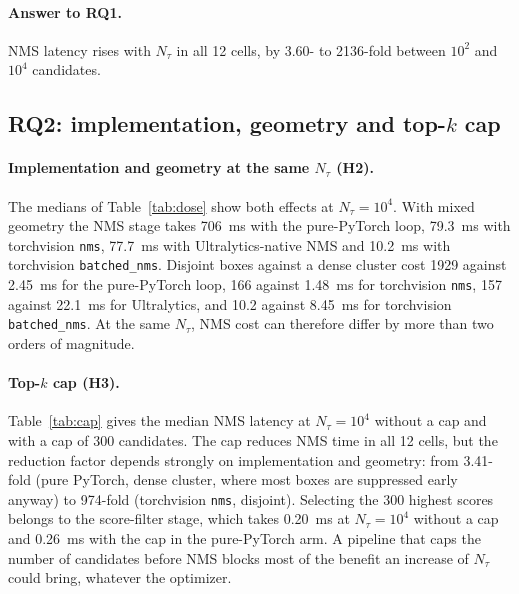 \documentclass[a4paper,fleqn]{cas-dc}
\newcommand{\Ntau}{N_{\tau}}
\begin{document}
\paragraph{Answer to RQ1.} NMS latency rises with $\Ntau$ in all 12 cells, by 3.60- to 2136-fold between $10^2$ and $10^4$ candidates.

\subsection{RQ2: implementation, geometry and top-$k$ cap}
\label{sec:q2}

\paragraph{Implementation and geometry at the same $\Ntau$ (H2).}
The medians of Table~\ref{tab:dose} show both effects at $\Ntau=10^4$. With mixed geometry the NMS stage takes 706~ms with the pure-PyTorch loop, 79.3~ms with torchvision \texttt{nms}, 77.7~ms with Ultralytics-native NMS and 10.2~ms with torchvision \texttt{batched\_nms}. Disjoint boxes against a dense cluster cost 1929 against 2.45~ms for the pure-PyTorch loop, 166 against 1.48~ms for torchvision \texttt{nms}, 157 against 22.1~ms for Ultralytics, and 10.2 against 8.45~ms for torchvision \texttt{batched\_nms}. At the same $\Ntau$, NMS cost can therefore differ by more than two orders of magnitude.

\paragraph{Top-$k$ cap (H3).}
Table~\ref{tab:cap} gives the median NMS latency at $\Ntau=10^4$ without a cap and with a cap of 300 candidates. The cap reduces NMS time in all 12 cells, but the reduction factor depends strongly on implementation and geometry: from 3.41-fold (pure PyTorch, dense cluster, where most boxes are suppressed early anyway) to 974-fold (torchvision \texttt{nms}, disjoint). Selecting the 300 highest scores belongs to the score-filter stage, which takes 0.20~ms at $\Ntau=10^4$ without a cap and 0.26~ms with the cap in the pure-PyTorch arm. A pipeline that caps the number of candidates before NMS blocks most of the benefit an increase of $\Ntau$ could bring, whatever the optimizer.


\end{document}

